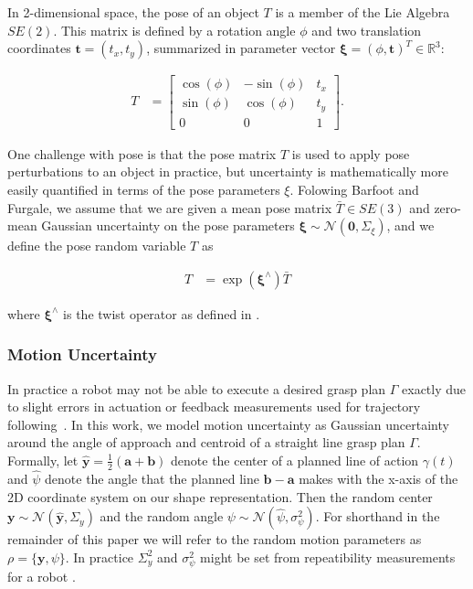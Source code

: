 \documentclass[journal,transmag]{IEEEtran}%
\newcommand{\ba}{\mathbf{a}}
\newcommand{\bb}{\mathbf{b}}
\newcommand{\bt}{\mathbf{t}}
\newcommand{\by}{\mathbf{y}}
\newcommand{\mN}{\mathcal{N}}
\begin{document}
In 2-dimensional space, the pose of an object $T$ is a member of the Lie Algebra $SE(2)$.
This matrix is defined by a rotation angle $\phi$ and two translation coordinates $\bt = (t_x, t_y)$, summarized in parameter vector $\mathbf{\xi} = (\phi, \bt)^T \in \mathbb{R}^3$:

\vspace{-2ex}
\begin{align*}
	T &= \left[  \begin{array}{ccc}
		\cos(\phi) & -\sin(\phi) & t_x \\
		\sin(\phi) & \cos(\phi) & t_y \\
		0 & 0 & 1
		\end{array} \right] .
\end{align*}

One challenge with pose is that the pose matrix $T$ is used to apply pose perturbations to an object in practice, but uncertainty is mathematically more easily quantified in terms of the pose parameters $\xi$.
Folowing Barfoot and Furgale, we assume that we are given a mean pose matrix $\bar{T} \in SE(3)$ and zero-mean Gaussian uncertainty on the pose parameters $\mathbf{\xi} \sim \mN \left( \mathbf{0}, \Sigma_{\xi} \right)$, and we define the pose random variable $T$ as

\vspace{-2ex}
\begin{align*}
	T  &= \exp \left( \mathbf{\xi}^{\wedge} \right) \bar{T}
\end{align*}

\noindent where $\mathbf{\xi}^\wedge$ is the twist operator as defined in \cite{barfoot2014Pose}.

 
 \subsubsection{Motion Uncertainty}
In practice a robot may not be able to execute a desired grasp plan $\Gamma$ exactly due to slight errors in actuation or feedback measurements used for trajectory following~\cite{kehoe2012estimating}.
In this work, we model motion uncertainty as Gaussian uncertainty around the angle of approach and centroid of a straight line grasp plan $\Gamma$.
Formally, let $\hat{\by} = \frac{1}{2} (\ba + \bb)$ denote the center of a planned line of action $\gamma(t)$ and $\hat{\psi}$ denote the angle that the planned line $\bb - \ba$ makes with the x-axis of the 2D coordinate system on our shape representation.
Then the random center $\by \sim \mN(\hat{\by}, \Sigma_y)$ and the random angle $\psi \sim \mN(\hat{\psi}, \sigma_{\psi}^2)$.
For shorthand in the remainder of this paper we will refer to the random motion parameters as $\rho = \{\by, \psi \}$.
In practice $\Sigma_{y}^2$ and $\sigma_{\psi}^2$ might be set from repeatibility measurements for a robot \cite{mooring1986determination}.
\end{document}
